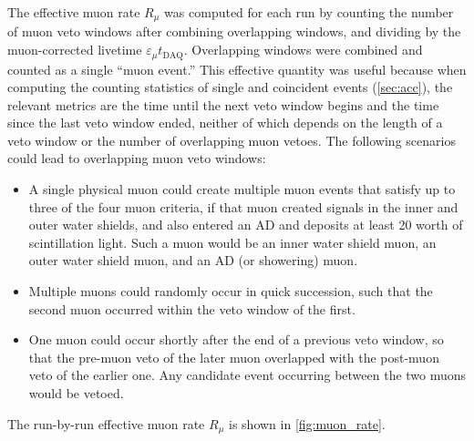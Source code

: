 The effective muon rate $R_\mu$ was computed for each run
by counting the number of muon veto windows
after combining overlapping windows, and dividing by the muon-corrected
livetime $\varepsilon_\mu t_{\text{DAQ}}$.
Overlapping windows were combined and counted as a single ``muon event.''
This effective quantity was useful
because when computing the counting statistics of single and coincident events
(\cref{sec:acc}),
the relevant metrics are the time until the next veto window begins
and the time since the last veto window ended,
neither of which depends on the length of a veto window
or the number of overlapping muon vetoes.
The following scenarios could lead to overlapping muon veto windows:
\begin{itemize}
    \item A single physical muon could create multiple muon events
        that satisfy up to three of the four muon criteria,
        if that muon created signals in the inner and outer water shields,
        and also entered an AD and deposits at least \SI{20}{\mev} worth of scintillation light.
        Such a muon would be an inner water shield muon,
        an outer water shield muon, and an AD
        (or showering) muon.
    \item Multiple muons could randomly occur in quick succession,
        such that the second muon occurred within the veto window of the first.
    \item One muon could occur shortly after the end of a previous veto window,
        so that the pre-muon veto of the later muon overlapped with the
        post-muon veto of the earlier one.
        Any candidate event occurring between the two muons would be vetoed.
\end{itemize}
The run-by-run effective muon rate $R_\mu$ is shown in \cref{fig:muon_rate}.



